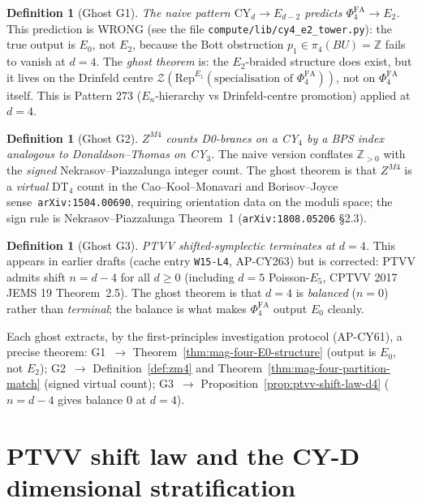 \documentclass[11pt]{article}
\providecommand{\Z}{\mathbb{Z}}
\providecommand{\cZ}{\mathcal{Z}}
\providecommand{\Eone}{E_1}
\providecommand{\Etwo}{E_2}
\providecommand{\Ezero}{E_0}
\providecommand{\Rep}{\mathrm{Rep}}
\providecommand{\PhiFA}{\Phi^{\mathrm{FA}}}
\theoremstyle{definition}
\newtheorem{definition}[theorem]{Definition}
\begin{document}
\begin{definition}[Ghost G1]
\label{def:ghost-G1}
\emph{The naive pattern $\mathrm{CY}_d \to E_{d-2}$ predicts
$\PhiFA_4 \to \Etwo$.} This prediction is WRONG (see the file
\texttt{compute/lib/cy4\_e2\_tower.py}): the true output is
$\Ezero$, not $\Etwo$, because the Bott obstruction
$p_1 \in \pi_4(BU) = \Z$ fails to vanish at $d = 4$. The \emph{ghost theorem}
is: the $\Etwo$-braided structure does exist, but it lives on the
Drinfeld centre $\cZ(\Rep^{\Eone}(\text{specialisation of }\PhiFA_4))$,
not on $\PhiFA_4$ itself. This is Pattern 273 ($E_n$-hierarchy vs
Drinfeld-centre promotion) applied at $d = 4$.
\end{definition}

\begin{definition}[Ghost G2]
\label{def:ghost-G2}
\emph{$Z^{M4}$ counts D0-branes on a CY$_4$ by a BPS index analogous
to Donaldson--Thomas on CY$_3$.} The naive version conflates $\Z_{> 0}$
with the \emph{signed} Nekrasov--Piazzalunga integer count. The ghost
theorem is that $Z^{M4}$ is a \emph{virtual} DT$_4$ count in the
Cao--Kool--Monavari and Borisov--Joyce sense~\texttt{arXiv:1504.00690},
requiring orientation data on the moduli space;
the sign rule is Nekrasov--Piazzalunga Theorem~1 (\texttt{arXiv:1808.05206} \S 2.3).
\end{definition}

\begin{definition}[Ghost G3]
\label{def:ghost-G3}
\emph{PTVV shifted-symplectic terminates at $d = 4$.} This appears in
earlier drafts (cache entry \texttt{W15-L4}, AP-CY263) but is corrected:
PTVV admits shift $n = d - 4$ for all $d \geq 0$ (including $d = 5$
Poisson-$E_5$, CPTVV 2017 JEMS 19 Theorem~2.5). The ghost theorem is
that $d = 4$ is \emph{balanced} ($n = 0$) rather than \emph{terminal};
the balance is what makes $\PhiFA_4$ output $\Ezero$ cleanly.
\end{definition}

Each ghost extracts, by the first-principles investigation protocol
(AP-CY61), a precise theorem: G1~$\to$ Theorem~\ref{thm:mag-four-E0-structure}
(output is $\Ezero$, not $\Etwo$); G2~$\to$ Definition~\ref{def:zm4}
and Theorem~\ref{thm:mag-four-partition-match} (signed virtual count);
G3~$\to$ Proposition~\ref{prop:ptvv-shift-law-d4}
($n = d - 4$ gives balance $0$ at $d = 4$).

\section{PTVV shift law and the CY-D dimensional stratification}
\label{sec:ptvv-shift-law}
\end{document}
